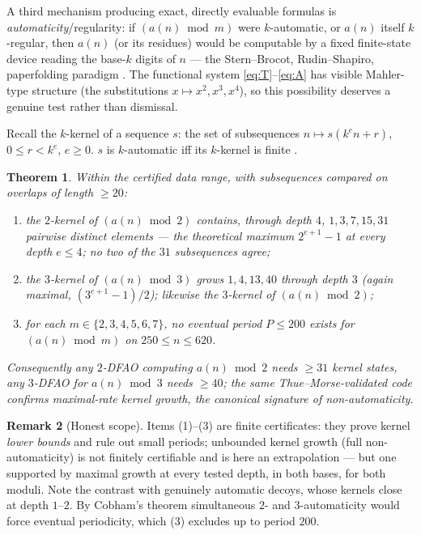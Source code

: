 \documentclass[11pt]{article}
\newtheorem{theorem}{Theorem}[section]
\theoremstyle{definition}
\newtheorem{remark}[theorem]{Remark}
\begin{document}
A third mechanism producing exact, directly evaluable formulas is
\emph{automaticity}/regularity: if $(a(n)\bmod m)$ were $k$-automatic, or $a(n)$
itself $k$-regular, then $a(n)$ (or its residues) would be computable by a fixed
finite-state device reading the base-$k$ digits of $n$ --- the Stern--Brocot,
Rudin--Shapiro, paperfolding paradigm \cite{AlloucheShallit2003}. The functional
system \eqref{eq:T}--\eqref{eq:A} has visible Mahler-type structure (the
substitutions $x\mapsto x^2,x^3,x^4$), so this possibility deserves a genuine
test rather than dismissal.

Recall the $k$-kernel of a sequence $s$: the set of subsequences
$n\mapsto s(k^e n+r)$, $0\le r<k^e$, $e\ge0$. $s$ is $k$-automatic iff its
$k$-kernel is finite \cite[Thm.~6.6.2]{AlloucheShallit2003}.

\begin{theorem}\label{thm:autom}
Within the certified data range, with subsequences compared on overlaps of
length $\ge 20$:
\begin{enumerate}
\item the $2$-kernel of $(a(n)\bmod 2)$ contains, through depth $4$,
$1,3,7,15,31$ pairwise distinct elements --- the theoretical maximum
$2^{e+1}-1$ at every depth $e\le4$; no two of the $31$ subsequences agree;
\item the $3$-kernel of $(a(n)\bmod 3)$ grows $1,4,13,40$ through depth $3$
(again maximal, $(3^{e+1}-1)/2$); likewise the $3$-kernel of $(a(n)\bmod2)$;
\item for each $m\in\{2,3,4,5,6,7\}$, no eventual period $P\le200$ exists for
$(a(n)\bmod m)$ on $250\le n\le 620$.
\end{enumerate}
Consequently any $2$-DFAO computing $a(n)\bmod 2$ needs $\ge31$ kernel states,
any $3$-DFAO for $a(n)\bmod3$ needs $\ge40$; the same Thue--Morse-validated code
confirms maximal-rate kernel growth, the canonical signature of
non-automaticity.
\end{theorem}

\begin{remark}[Honest scope]
Items (1)--(3) are finite certificates: they prove kernel \emph{lower bounds}
and rule out small periods; unbounded kernel growth (full non-automaticity) is
not finitely certifiable and is here an extrapolation --- but one supported by
maximal growth at every tested depth, in both bases, for both moduli. Note the
contrast with genuinely automatic decoys, whose kernels close at depth $1$--$2$.
By Cobham's theorem \cite{Cobham1969} simultaneous $2$- and $3$-automaticity
would force eventual periodicity, which (3) excludes up to period $200$.
\end{remark}
\end{document}
